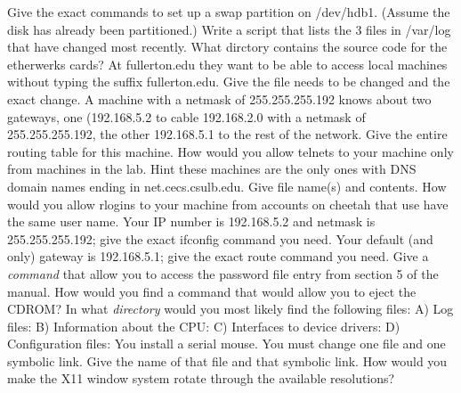 \ques
Give the exact commands to set up a swap partition on {\ltt{}/dev/hdb1}.
(Assume the disk has already been partitioned.)
\vskip 1.5in
\ques
Write a script that lists the 3 files in {\ltt{}/var/log} that have changed
most recently.
\vskip 1.5in
\ques
What dirctory contains the source code for the etherwerks cards?
\vskip 0.4in
At {\ltt{}fullerton.edu} they want to be able to access local machines
without typing the suffix {\ltt{}fullerton.edu}.
Give the file needs to be changed and the exact change.
\vskip 1.0in
A machine with a netmask of {\ltt{}255.255.255.192}
knows about two gateways, one ({\ltt{}192.168.5.2} to cable
{\ltt{}192.168.2.0} with a netmask of {\ltt{}255.255.255.192}, the other 
{\ltt{}192.168.5.1} to the rest of the network.
Give the entire routing table for this machine.
\vskip 2.0in
\vfill\eject
\ques
How would you allow telnets to your machine only from machines
in the lab. Hint these machines are the only ones with
DNS domain names ending in {\ltt{}net.cecs.csulb.edu}.
Give file name(s) and contents.
\vskip 0.9in
How would you allow rlogins to your machine from accounts
on {\ltt{}cheetah} that use have the same user name.
\vskip 0.9in
Your IP number is 192.168.5.2 and netmask is 255.255.255.192;
give the exact {\ltt{}ifconfig} command you need.
\vskip 0.4in
Your default (and only) gateway is 192.168.5.1;
give the exact {\ltt{}route} command you need.
\vskip 0.4in
\ques
Give a {\it command} that allow you to access the password file entry
from section 5 of the manual.
\vskip 0.4in
How would you find a command that would allow you to eject the CDROM?
\vskip 0.4in
In what {\it directory} would you most likely find
the following files:
\hfill\break
A) Log files:
\vskip 0.2in
B) Information about the CPU:
\vskip 0.2in
C) Interfaces to device drivers:
\vskip 0.2in
D) Configuration files:
\vskip 0.2in
\ques
You install a serial mouse. You must change one file and one symbolic
link. Give the name of that file and that symbolic link.
\vskip 1.0in
How would you make the X11 window system rotate through the available
resolutions?
\vskip 0.7in
\bye
